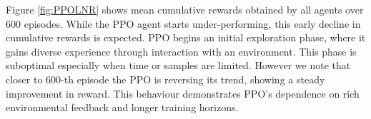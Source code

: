 \documentclass[
]{article}
\numberwithin{equation}{section}
\begin{document}
Figure \ref{fig:PPOLNR} shows mean cumulative rewards obtained by all agents over 600 episodes. While the PPO agent starts under-performing, this early decline in cumulative rewards is expected. PPO begins an initial exploration phase, where it gains diverse experience through interaction with an environment. This phase is suboptimal especially when time or samples are limited. However we note that closer to 600-th episode the PPO is reversing its trend, showing a steady improvement in reward. This behaviour demonstrates PPO's dependence on rich environmental feedback and longer training horizons.  
\end{document}
